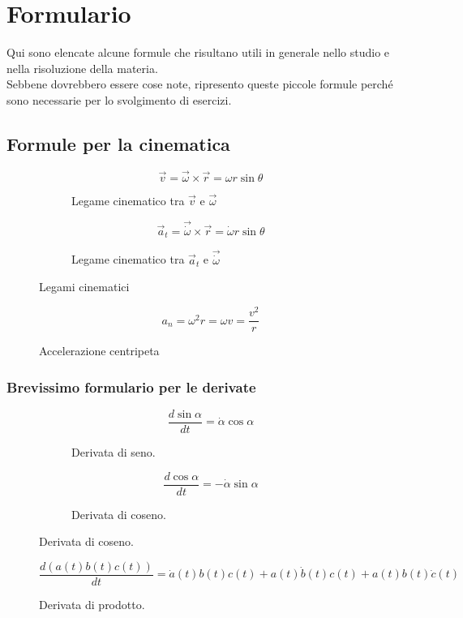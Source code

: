 \documentclass[main.tex]{subfiles}
\begin{document}
\chapter{Formulario}
Qui sono elencate alcune formule che risultano utili in generale nello studio e nella risoluzione della materia.
\\
Sebbene dovrebbero essere cose note, ripresento queste piccole formule perché sono necessarie per lo svolgimento di esercizi.
\section{Formule per la cinematica}
\begin{figure}[H]
  \begin{subfigure}[b]{.5\textwidth}
  \centering
\[
	\vec{v} = \vec{\omega}\times\vec{r} = \omega r \sin\theta
\]
  \caption{Legame cinematico tra $\vec{v}$ e $\vec{\omega}$}
  \end{subfigure}
  \hfill
  \begin{subfigure}[b]{.5\textwidth}
  \centering
\[
	\vec{a}_t = \vec{\dot{\omega}}\times\vec{r} = \dot{\omega} r \sin\theta
\]
  \caption{Legame cinematico tra $\vec{a}_t$ e $\vec{\dot{\omega}}$}
  \end{subfigure}
  \caption{Legami cinematici}
\end{figure}

\begin{figure}[H]
  \centering
\[
	a_n = \omega^2 r = \omega v = \dfrac{v^2}{r}
\]
  \caption{Accelerazione centripeta}
\end{figure}
\subsection{Brevissimo formulario per le derivate}
\begin{figure}[H]
  \begin{subfigure}[b]{.5\textwidth}
  \centering
\[
	\dfrac{d\sin\alpha}{dt} = \dot{\alpha}\cos\alpha
\]
  \caption{Derivata di seno.}
  \end{subfigure}
  \hfill
  \begin{subfigure}[b]{.5\textwidth}
  \centering
\[
	\dfrac{d\cos\alpha}{dt} = -\dot{\alpha}\sin\alpha
\]
  \caption{Derivata di coseno.}
  \end{subfigure}
\end{figure}

\begin{figure}[H]
  \centering
\[
	\dfrac{d(a(t)b(t)c(t))}{dt} = \dot{a}(t)b(t)c(t) + a(t)\dot{b}(t)c(t) + a(t)b(t)\dot{c}(t)
\]
  \caption{Derivata di prodotto.}
\end{figure}
\end{document}
